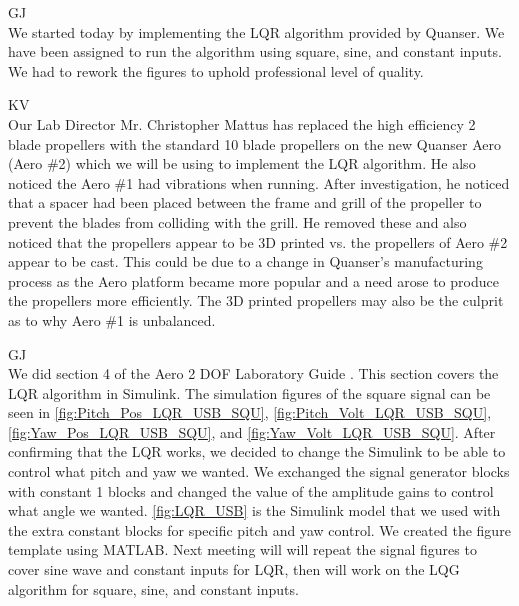 \documentclass[fontsize=11pt, %
                             paper=letter, %
                             openany, %
                             captions=tableheading,
                             index=totoc,
                             hyperref]{labbook}
\begin{document}
\begin{addmargin}[0cm]{0cm}

GJ\\
We started today by implementing the LQR algorithm provided by Quanser.  We have been assigned to run the algorithm using square, sine, and constant inputs.  We had to rework the figures to uphold professional level of quality.

KV\\
Our Lab Director Mr. Christopher Mattus has replaced the high efficiency 2 blade propellers with the standard 10 blade propellers on the new Quanser Aero (Aero \#2) which we will be using to implement the LQR algorithm.  He also noticed the Aero \#1 had vibrations when running.  After investigation, he noticed that a spacer had been placed between the frame and grill of the propeller to prevent the blades from colliding with the grill.  He removed these and also noticed that the propellers appear to be 3D printed vs. the propellers of Aero \#2 appear to be cast.  This could be due to a change in Quanser's manufacturing process as the Aero platform became more popular and a need arose to produce the propellers more efficiently.  The 3D printed propellers may also be the culprit as to why Aero \#1 is unbalanced.

GJ\\
We did section 4 of the Aero 2 DOF Laboratory Guide \cite{LQR_Lab_Guide}.  This section covers the LQR algorithm in Simulink.  The simulation figures of the square signal can be seen in \autoref{fig:Pitch_Pos_LQR_USB_SQU}, \autoref{fig:Pitch_Volt_LQR_USB_SQU}, \autoref{fig:Yaw_Pos_LQR_USB_SQU}, and \autoref{fig:Yaw_Volt_LQR_USB_SQU}. After confirming that the LQR works, we decided to change the Simulink to be able to control what pitch and yaw we wanted.  We exchanged the signal generator blocks with constant 1 blocks and changed the value of the amplitude gains to control what angle we wanted.  \autoref{fig:LQR_USB} is the Simulink model that we used with the extra constant blocks for specific pitch and yaw control. We created the figure template using MATLAB.  Next meeting will will repeat the signal figures to cover sine wave and constant inputs for LQR, then will work on the LQG algorithm for square, sine, and constant inputs.


\end{addmargin}
\end{document}
